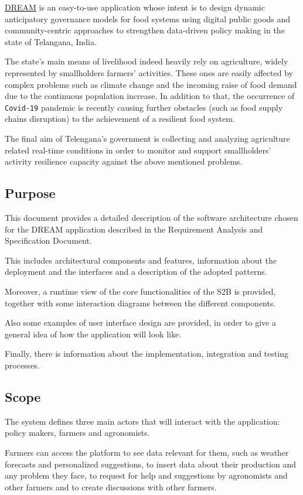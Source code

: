 \hyperref[tab:acronymsTable]{DREAM} is an easy-to-use application whose intent is \cite{grw_GitHub} to design dynamic anticipatory governance models for food systems using digital public goods and community-centric approaches to strengthen data-driven policy making in the state of Telangana, India.

The state's main means of livelihood indeed heavily rely on agriculture, widely represented by smallholders farmers' activities. These ones are easily affected by complex problems such as climate change and the incoming raise of food demand due to the continuous population increase. In addition to that, the occurrence of \texttt{Covid-19} pandemic is recently causing further obstacles (such as food supply chains disruption) to the achievement of a resilient food system.

The final aim of Telengana's government is collecting and analyzing agriculture related real-time conditions in order to monitor and support smallholders' activity resilience capacity against the above mentioned problems.

\subsection{Purpose}
\label{sec:purpose}
This document provides a detailed description of the software architecture chosen for the DREAM application described in the Requirement Analysis and Specification Document. 

This includes architectural components and features, information about the deployment and the interfaces and a description of the adopted patterns. 

Moreover, a runtime view of the core functionalities of the S2B is provided, together with some interaction diagrams between the different components. 

Also some examples of user interface design are provided, in order to give a general idea of how the application will look like.

Finally, there is information about the implementation, integration and testing processes.


\subsection{Scope}
\label{sec:scope}
The system defines three main actors that will interact with the application: policy makers, farmers and agronomists.

Farmers can access the platform to see data relevant for them, such as weather forecasts and personalized suggestions, to insert data about their production and any problem they face, to request for help and suggestions by agronomists and other farmers and to create discussions with other farmers.



